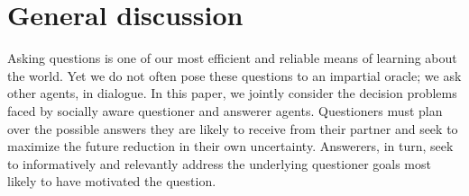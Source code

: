 \documentclass[11pt, floatsintext]{apa6}
\begin{document}



\section{General discussion}
\label{sec:gd}


Asking questions is one of our most efficient and reliable means of learning about the world. 
Yet we do not often pose these questions to an impartial oracle; we ask other agents, in dialogue. In this paper, we jointly consider the decision problems faced by socially aware questioner and answerer agents. 
Questioners must plan over the possible answers they are likely to receive from their partner and seek to maximize the future reduction in their own uncertainty. 
Answerers, in turn, seek to informatively and relevantly address the underlying questioner goals most likely to have motivated the question. 
\end{document}
